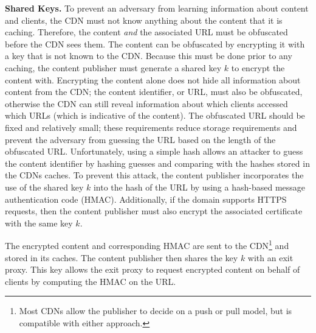 
\textbf{Shared Keys.} 
To prevent an adversary from learning information about content and clients, the CDN must not know anything
about the
content that it is caching.  Therefore, the content {\it and} the associated URL
must be obfuscated
before the CDN sees them.  The content can be obfuscated by encrypting it with a
key that is not
known to the CDN.  Because this must be done prior to any caching, the content publisher must 
generate a shared key $k$ to encrypt the content with. Encrypting the content alone does not 
hide all information about content from the CDN; the content identifier, or URL, must also be obfuscated, otherwise the 
CDN can still reveal information about which clients accessed which URLs (which is indicative 
of the content).  The obfuscated URL should be fixed and relatively
small; 
these requirements reduce storage requirements and prevent the adversary from guessing
the
URL based on the length of the obfuscated URL.  Unfortunately, using a simple hash allows an 
attacker to guess the content identifier by hashing guesses and comparing with 
the hashes stored in the CDNs caches.  To prevent this attack, the content publisher incorporates the use 
of the shared key $k$ into the hash of the URL by using a hash-based message authentication code 
(HMAC).  Additionally, if the domain supports HTTPS requests, then the content publisher must 
also encrypt the associated certificate with the same key $k$.

The encrypted content and corresponding HMAC are sent to the CDN\footnote{Most CDNs
allow the publisher to
decide on a push or pull model, but \system{} is compatible with either approach.}
and stored in
its caches.  The content publisher then shares the key $k$ with an exit proxy. 
This key allows the 
exit proxy to request encrypted content on behalf of clients by computing the HMAC on the URL.  

